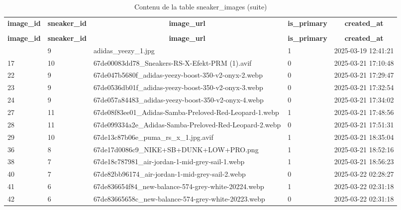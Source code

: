 %
%
 \begin{longtable}{|l|l|l|l|l|} 
 \hline \endhead \hline \endfoot \hline 
 \caption{Contenu de la table sneaker\_images} \label{tab:sneaker_images-data} \\\hline \multicolumn{1}{|c|}{\textbf{image\_id}} & \multicolumn{1}{|c|}{\textbf{sneaker\_id}} & \multicolumn{1}{|c|}{\textbf{image\_url}} & \multicolumn{1}{|c|}{\textbf{is\_primary}} & \multicolumn{1}{|c|}{\textbf{created\_at}} \\ \hline \hline  \endfirsthead 
\caption{Contenu de la table sneaker\_images (suite)} \\ \hline \multicolumn{1}{|c|}{\textbf{image\_id}} & \multicolumn{1}{|c|}{\textbf{sneaker\_id}} & \multicolumn{1}{|c|}{\textbf{image\_url}} & \multicolumn{1}{|c|}{\textbf{is\_primary}} & \multicolumn{1}{|c|}{\textbf{created\_at}} \\ \hline \hline \endhead \endfoot
14 & 9 & adidas\_yeezy\_1.jpg & 1 & 2025-03-19 12:41:21 \\ \hline 
17 & 10 & 67de00083dd78\_Sneakers-RS-X-Efekt-PRM (1).avif & 0 & 2025-03-21 17:10:48 \\ \hline 
22 & 9 & 67de047b5680f\_adidas-yeezy-boost-350-v2-onyx-2.webp & 0 & 2025-03-21 17:29:47 \\ \hline 
23 & 9 & 67de0536db01f\_adidas-yeezy-boost-350-v2-onyx-3.webp & 0 & 2025-03-21 17:32:54 \\ \hline 
24 & 9 & 67de057a84483\_adidas-yeezy-boost-350-v2-onyx-4.webp & 0 & 2025-03-21 17:34:02 \\ \hline 
27 & 11 & 67de08f83ee01\_Adidas-Samba-Preloved-Red-Leopard-1.webp & 1 & 2025-03-21 17:48:56 \\ \hline 
28 & 11 & 67de099334a2e\_Adidas-Samba-Preloved-Red-Leopard-2.webp & 0 & 2025-03-21 17:51:31 \\ \hline 
29 & 10 & 67de13c87b06e\_puma\_rs\_x\_1.jpg.avif & 1 & 2025-03-21 18:35:04 \\ \hline 
36 & 8 & 67de17d0086c9\_NIKE+SB+DUNK+LOW+PRO.png & 1 & 2025-03-21 18:52:16 \\ \hline 
38 & 7 & 67de18c787981\_air-jordan-1-mid-grey-sail-1.webp & 1 & 2025-03-21 18:56:23 \\ \hline 
40 & 7 & 67de82bb96174\_air-jordan-1-mid-grey-sail-2.webp & 0 & 2025-03-22 02:28:27 \\ \hline 
41 & 6 & 67de836654f84\_new-balance-574-grey-white-20224.webp & 1 & 2025-03-22 02:31:18 \\ \hline 
42 & 6 & 67de83665658c\_new-balance-574-grey-white-20223.webp & 0 & 2025-03-22 02:31:18 \\ \hline 

\end{longtable}
